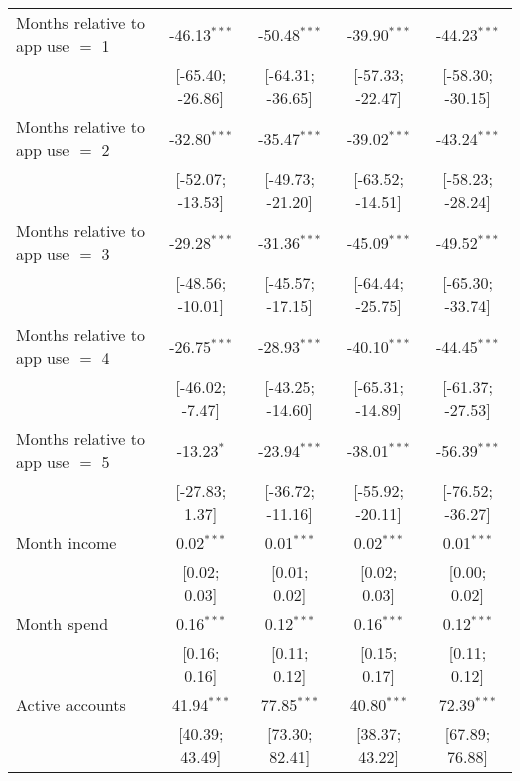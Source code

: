 \begin{table}[htbp]
\begin{threeparttable}[b]
\begin{tabular}{lcccc}
         Months relative to app use $=$ 1  & -46.13$^{***}$     & -50.48$^{***}$     & -39.90$^{***}$   & -44.23$^{***}$\\   
                                           & [-65.40; -26.86]   & [-64.31; -36.65]   & [-57.33; -22.47] & [-58.30; -30.15]\\   
         Months relative to app use $=$ 2  & -32.80$^{***}$     & -35.47$^{***}$     & -39.02$^{***}$   & -43.24$^{***}$\\   
                                           & [-52.07; -13.53]   & [-49.73; -21.20]   & [-63.52; -14.51] & [-58.23; -28.24]\\   
         Months relative to app use $=$ 3  & -29.28$^{***}$     & -31.36$^{***}$     & -45.09$^{***}$   & -49.52$^{***}$\\   
                                           & [-48.56; -10.01]   & [-45.57; -17.15]   & [-64.44; -25.75] & [-65.30; -33.74]\\   
         Months relative to app use $=$ 4  & -26.75$^{***}$     & -28.93$^{***}$     & -40.10$^{***}$   & -44.45$^{***}$\\   
                                           & [-46.02; -7.47]    & [-43.25; -14.60]   & [-65.31; -14.89] & [-61.37; -27.53]\\   
         Months relative to app use $=$ 5  & -13.23$^{*}$       & -23.94$^{***}$     & -38.01$^{***}$   & -56.39$^{***}$\\   
                                           & [-27.83; 1.37]     & [-36.72; -11.16]   & [-55.92; -20.11] & [-76.52; -36.27]\\   
         Month income                      & 0.02$^{***}$       & 0.01$^{***}$       & 0.02$^{***}$     & 0.01$^{***}$\\   
                                           & [0.02; 0.03]       & [0.01; 0.02]       & [0.02; 0.03]     & [0.00; 0.02]\\   
         Month spend                       & 0.16$^{***}$       & 0.12$^{***}$       & 0.16$^{***}$     & 0.12$^{***}$\\   
                                           & [0.16; 0.16]       & [0.11; 0.12]       & [0.15; 0.17]     & [0.11; 0.12]\\   
         Active accounts                   & 41.94$^{***}$      & 77.85$^{***}$      & 40.80$^{***}$    & 72.39$^{***}$\\   
                                           & [40.39; 43.49]     & [73.30; 82.41]     & [38.37; 43.22]   & [67.89; 76.88]\\   

\end{tabular}
\end{threeparttable}
\end{table}

